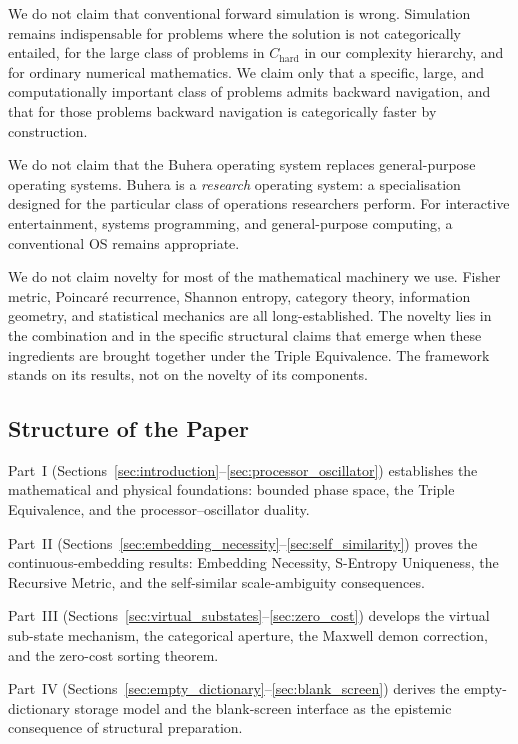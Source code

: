 \documentclass[twocolumn,11pt,a4paper]{article}
\begin{document}
We do not claim that conventional forward simulation is wrong. Simulation remains indispensable for problems where the solution is not categorically entailed, for the large class of problems in $C_{\text{hard}}$ in our complexity hierarchy, and for ordinary numerical mathematics. We claim only that a specific, large, and computationally important class of problems admits backward navigation, and that for those problems backward navigation is categorically faster by construction.

We do not claim that the Buhera operating system replaces general-purpose operating systems. Buhera is a \emph{research} operating system: a specialisation designed for the particular class of operations researchers perform. For interactive entertainment, systems programming, and general-purpose computing, a conventional OS remains appropriate.

We do not claim novelty for most of the mathematical machinery we use. Fisher metric, Poincar\'e recurrence, Shannon entropy, category theory, information geometry, and statistical mechanics are all long-established. The novelty lies in the combination and in the specific structural claims that emerge when these ingredients are brought together under the Triple Equivalence. The framework stands on its results, not on the novelty of its components.

\subsection{Structure of the Paper}

Part~I (Sections~\ref{sec:introduction}--\ref{sec:processor_oscillator}) establishes the mathematical and physical foundations: bounded phase space, the Triple Equivalence, and the processor--oscillator duality.

Part~II (Sections~\ref{sec:embedding_necessity}--\ref{sec:self_similarity}) proves the continuous-embedding results: Embedding Necessity, S-Entropy Uniqueness, the Recursive Metric, and the self-similar scale-ambiguity consequences.

Part~III (Sections~\ref{sec:virtual_substates}--\ref{sec:zero_cost}) develops the virtual sub-state mechanism, the categorical aperture, the Maxwell demon correction, and the zero-cost sorting theorem.

Part~IV (Sections~\ref{sec:empty_dictionary}--\ref{sec:blank_screen}) derives the empty-dictionary storage model and the blank-screen interface as the epistemic consequence of structural preparation.
\end{document}
